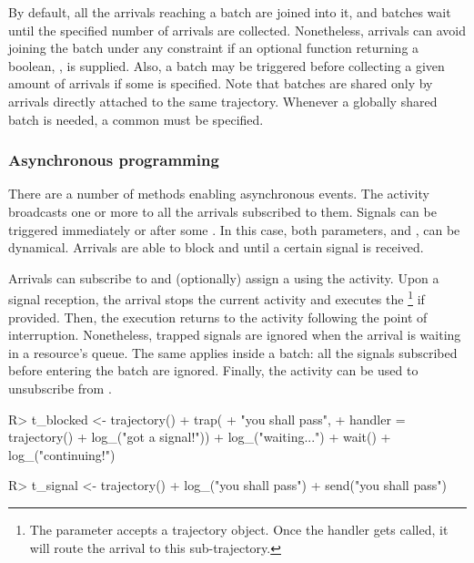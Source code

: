 \documentclass[
  nojss]{jss}
\begin{document}
By default, all the arrivals reaching a batch are joined into it, and
batches wait until the specified number of arrivals are collected.
Nonetheless, arrivals can avoid joining the batch under any constraint
if an optional function returning a boolean, , is supplied.
Also, a batch may be triggered before collecting a given amount of
arrivals if some  is specified. Note that batches are
shared only by arrivals directly attached to the same trajectory.
Whenever a globally shared batch is needed, a common  must be
specified.

\subsubsection{Asynchronous programming}\label{asynchronous-programming}

There are a number of methods enabling asynchronous events. The
 activity broadcasts one or more  to all the
arrivals subscribed to them. Signals can be triggered immediately or
after some . In this case, both parameters, 
and , can be dynamical. Arrivals are able to block and
 until a certain signal is received.

Arrivals can subscribe to  and (optionally) assign a
 using the  activity. Upon a signal
reception, the arrival stops the current activity and executes the
\footnote{The  parameter accepts a
  trajectory object. Once the handler gets called, it will route the
  arrival to this sub-trajectory.} if provided. Then, the execution
returns to the activity following the point of interruption.
Nonetheless, trapped signals are ignored when the arrival is waiting in
a resource's queue. The same applies inside a batch: all the signals
subscribed before entering the batch are ignored. Finally, the
 activity can be used to unsubscribe from .

\begin{CodeChunk}
\begin{CodeInput}
R> t_blocked <- trajectory() %
+   trap(
+     "you shall pass",
+     handler = trajectory() %
+       log_("got a signal!")) %
+   log_("waiting...") %
+   wait() %
+   log_("continuing!")
\end{CodeInput}
\end{CodeChunk}

\begin{CodeChunk}
\begin{CodeInput}
R> t_signal <- trajectory() %
+   log_("you shall pass") %
+   send("you shall pass")
\end{CodeInput}
\end{CodeChunk}
\end{document}
